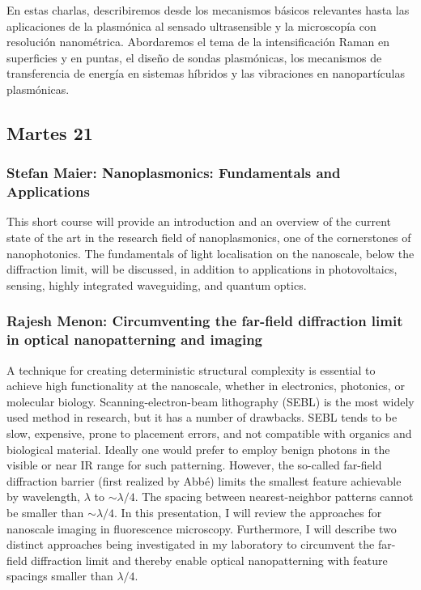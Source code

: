 En estas charlas, describiremos desde los mecanismos básicos relevantes hasta las aplicaciones de la plasmónica al sensado ultrasensible y la microscopía con resolución nanométrica.  Abordaremos el tema de la intensificación Raman en superficies y en puntas, el diseño de sondas plasmónicas, los mecanismos de transferencia de energía en sistemas híbridos y las vibraciones en nanopartículas plasmónicas.

\subsection*{Martes 21}

\subsubsection*{Stefan Maier: Nanoplasmonics: Fundamentals and Applications}

This short course will provide an introduction and an overview of the current
state of the art in the research field of nanoplasmonics, one of the
cornerstones of nanophotonics. The fundamentals of light localisation on the
nanoscale, below the diffraction limit, will be discussed, in addition to
applications in photovoltaics, sensing, highly integrated waveguiding, and
quantum optics.

    \subsubsection*{Rajesh Menon: Circumventing the far-field diffraction limit
in optical nanopatterning and imaging}

A technique for creating deterministic structural complexity is essential to
achieve high functionality at the
nanoscale, whether in electronics, photonics, or molecular biology.
Scanning-electron-beam lithography (SEBL) is
the most widely used method in research, but it has a number of drawbacks. SEBL
tends to be slow, expensive,
prone to placement errors, and not compatible with organics and biological
material. Ideally one would prefer to
employ benign photons in the visible or near IR range for such patterning.
However, the so-called far-field
diffraction barrier (first realized by Abb\'e) limits the smallest feature
achievable by wavelength, $\lambda$ to $\sim \lambda / 4$. The
spacing between nearest-neighbor patterns cannot be smaller than $\sim \lambda /
4$.
In this presentation, I will review the approaches for nanoscale imaging in
fluorescence microscopy.
Furthermore, I will describe two distinct approaches being investigated in my
laboratory to circumvent the far-field
diffraction limit and thereby enable optical nanopatterning with feature
spacings smaller than $\lambda / 4$.

